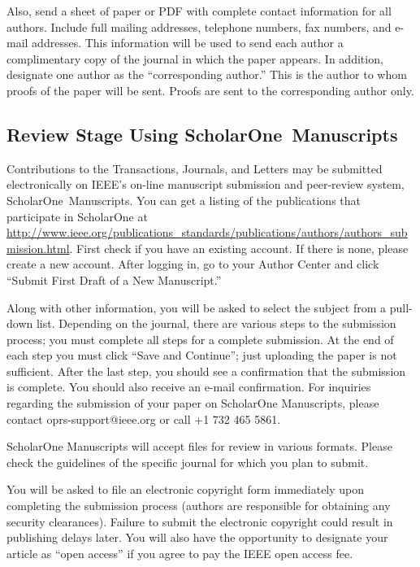 \documentclass{ieeeaccess}
\begin{document}
Also, send a sheet of paper or PDF with complete contact information for all 
authors. Include full mailing addresses, telephone numbers, fax numbers, and 
e-mail addresses. This information will be used to send each author a 
complimentary copy of the journal in which the paper appears. In addition, 
designate one author as the ``corresponding author.'' This is the author to 
whom proofs of the paper will be sent. Proofs are sent to the corresponding 
author only.

\subsection{Review Stage Using ScholarOne\textregistered\ Manuscripts}
Contributions to the Transactions, Journals, and Letters may be submitted 
electronically on IEEE's on-line manuscript submission and peer-review 
system, ScholarOne\textregistered\ Manuscripts. You can get a listing of the 
publications that participate in ScholarOne at 
\underline{http://www.ieee.org/publications\_standards/publications/}\break\underline{authors/authors\_submission.html}.
First check if you have an existing account. If there is none, please create 
a new account. After logging in, go to your Author Center and click ``Submit 
First Draft of a New Manuscript.'' 

Along with other information, you will be asked to select the subject from a 
pull-down list. Depending on the journal, there are various steps to the 
submission process; you must complete all steps for a complete submission. 
At the end of each step you must click ``Save and Continue''; just uploading 
the paper is not sufficient. After the last step, you should see a 
confirmation that the submission is complete. You should also receive an 
e-mail confirmation. For inquiries regarding the submission of your paper on 
ScholarOne Manuscripts, please contact oprs-support@ieee.org or call +1 732 
465 5861.

ScholarOne Manuscripts will accept files for review in various formats. 
Please check the guidelines of the specific journal for which you plan to 
submit.

You will be asked to file an electronic copyright form immediately upon 
completing the submission process (authors are responsible for obtaining any 
security clearances). Failure to submit the electronic copyright could 
result in publishing delays later. You will also have the opportunity to 
designate your article as ``open access'' if you agree to pay the IEEE open 
access fee. 
\end{document}
